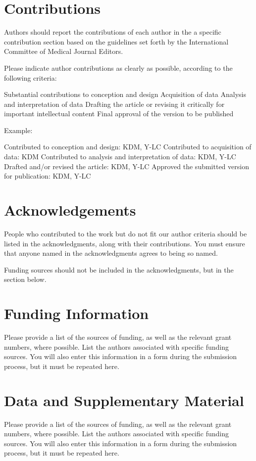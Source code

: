 \documentclass[12pt, firstpage]{article}
\begin{document}
\section{Contributions}
Authors should report the contributions of each author in the a specific contribution section based on the guidelines set forth by the International Committee of Medical Journal Editors. 

Please indicate author contributions as clearly as possible, according to the following criteria:

    Substantial contributions to conception and design
    Acquisition of data
    Analysis and interpretation of data
    Drafting the article or revising it critically for important intellectual content
    Final approval of the version to be published

Example:

Contributed to conception and design: KDM, Y-LC
Contributed to acquisition of data: KDM
Contributed to analysis and interpretation of data: KDM, Y-LC
Drafted and/or revised the article: KDM, Y-LC
Approved the submitted version for publication: KDM, Y-LC

\section{Acknowledgements}
People who contributed to the work but do not fit our author criteria should be listed in the acknowledgments, along with their contributions. You must ensure that anyone named in the acknowledgments agrees to being so named.

Funding sources should not be included in the acknowledgments, but in the section below.

\section{Funding Information}
Please provide a list of the sources of funding, as well as the relevant grant numbers, where possible. List the authors associated with specific funding sources. You will also enter this information in a form during the submission process, but it must be repeated here.

\section{Data and Supplementary Material}
Please provide a list of the sources of funding, as well as the relevant grant numbers, where possible. List the authors associated with specific funding sources. You will also enter this information in a form during the submission process, but it must be repeated here.




	
\end{document}
